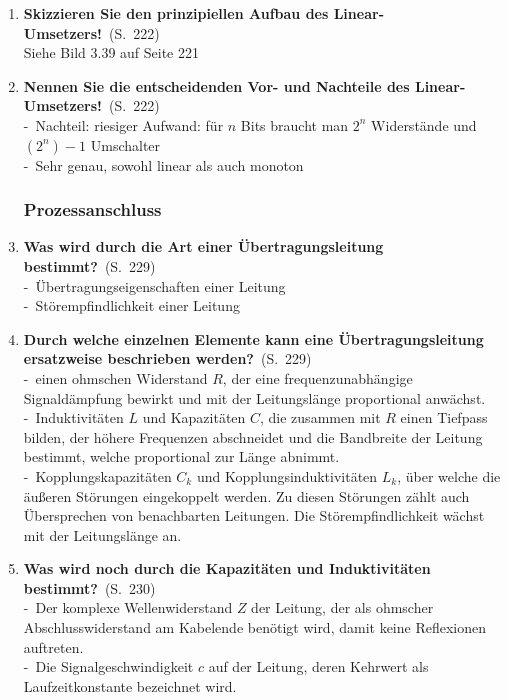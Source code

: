 \documentclass[a4paper,12pt]{article}
\newcommand{\question}[3]{\pagebreak[3]\item {\textbf{#1?}}\ (S.\ #2)#3}
\newcommand{\statement}[3]{\pagebreak[3]\item {\textbf{#1!}}\ (S.\ #2)#3}
\newcommand{\catchword}[1]{\\-\ #1}
\newcommand{\normaltext}[1]{\\#1}
\newcommand{\page}[1]{#1}
\newcommand{\view}[2]{\index{Skizze}Siehe Bild #1 auf Seite #2}
\begin{document}
\begin{enumerate}
  \statement{Skizzieren Sie den prinzipiellen Aufbau des Linear-Umsetzers}{\page{222}}
  {
    \normaltext{\view{3.39}{221}}
  }

  \statement{Nennen Sie die entscheidenden Vor- und Nachteile des Linear-Umsetzers}{\page{222}}
  {
    \catchword{Nachteil: riesiger Aufwand: für $n$ Bits braucht man $2^n$ Widerstände und
               $(2^n)-1$ Umschalter}
    \catchword{Sehr genau, sowohl linear als auch monoton}
  }

  \subsubsection{Prozessanschluss}

  \question{Was wird durch die Art einer Übertragungsleitung bestimmt}{\page{229}}
  {
    \catchword{Übertragungseigenschaften einer Leitung}
    \catchword{Störempfindlichkeit einer Leitung}
  }

  \question{Durch welche einzelnen Elemente kann eine Übertragungsleitung ersatzweise
            beschrieben werden}{\page{229}}
  {
    \catchword{einen ohmschen Widerstand $R$, der eine frequenzunabhängige Signaldämpfung bewirkt und
               mit der Leitungslänge proportional anwächst.}
    \catchword{Induktivitäten $L$ und Kapazitäten $C$, die zusammen mit $R$ einen Tiefpass bilden,
               der höhere Frequenzen abschneidet und die Bandbreite der Leitung bestimmt, welche
               proportional zur Länge abnimmt.}
    \catchword{Kopplungskapazitäten $C_k$ und Kopplungsinduktivitäten $L_k$, über welche die äußeren
               Störungen eingekoppelt werden. Zu diesen Störungen zählt auch Übersprechen von benachbarten
               Leitungen. Die Störempfindlichkeit wächst mit der Leitungslänge an.}
  }

  \question{Was wird noch durch die Kapazitäten und Induktivitäten bestimmt}{\page{230}}
  {
    \catchword{Der komplexe Wellenwiderstand $Z$ der Leitung, der als ohmscher Abschlusswiderstand
               am Kabelende benötigt wird, damit keine Reflexionen auftreten.}
    \catchword{Die Signalgeschwindigkeit $c$ auf der Leitung, deren Kehrwert als Laufzeitkonstante
               bezeichnet wird.}
  }


\end{enumerate}
\end{document}
